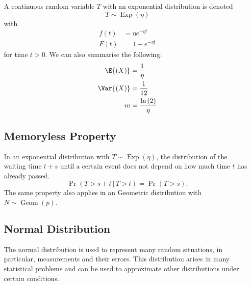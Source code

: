 \documentclass{article}
\begin{document}
\begin{multicols}{3}
    A continuous random variable \(T\) with an exponential distribution is denoted
    \begin{equation*}
        T \sim \operatorname{Exp}{\left( \eta \right)}
    \end{equation*}
    with
    \begin{align*}
        f\left( t \right) & = \eta e^{-\eta t} \\
        F\left( t \right) & = 1 - e^{-\eta t}
    \end{align*}
    for time \(t > 0\).
    We can also summarise the following:
    \begin{align*}
        \E{\left( X \right)}   & = \frac{1}{\eta}                     \\
        \Var{\left( X \right)} & = \frac{1}{12}                       \\
        m                      & = \frac{\ln{\left( 2 \right)}}{\eta}
    \end{align*}
    \subsection{Memoryless Property}
    In an exponential distribution with \(T \sim \operatorname{Exp}{\left( \eta \right)}\),
    the distribution of the waiting time \(t + s\) until a certain event does not depend on
    how much time \(t\) has already passed.
    \begin{equation*}
        \Pr{\left( T > s + t \,\vert\, T > t \right)} = \Pr{\left( T > s \right)}.
    \end{equation*}
    The same property also applies in an Geometric distribution with \(N \sim \operatorname{Geom}{\left( p \right)}\).
    \subsection{Normal Distribution}
    The normal distribution is used to represent many random situations, in particular, measurements and their errors.
    This distribution arises in many statistical problems and can be used to \linebreak approximate other distributions
    under certain conditions.


\end{multicols}
\end{document}
